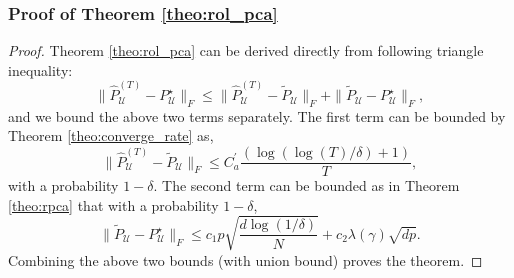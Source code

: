 \documentclass[11pt]{article}
\begin{document}
\subsubsection{Proof of Theorem \ref{theo:rol_pca}}
\begin{proof}
	Theorem \ref{theo:rol_pca} can be derived directly from following triangle inequality:
	\begin{equation*}
	\|\widehat{P}_\mathcal{U}^{(T)} - {P}_{\mathcal{U}}^{\star} \|_F \leq \|\widehat{P}_\mathcal{U}^{(T)} - \widetilde{P}_\mathcal{U} \|_F + \|\widetilde{P}_\mathcal{U} - {P}_{\mathcal{U}}^{\star}\|_F,
	\end{equation*} 
	and we  bound the above two terms separately. The first term can be bounded by Theorem \ref{theo:converge_rate} as,
	\begin{equation*}
	\|\widehat{P}_\mathcal{U}^{(T)} - \widetilde{P}_\mathcal{U} \|_F \leq C_a^\prime \frac{( \log(\log(T)/\delta)+1)}{ T},
	\end{equation*}
	with a probability $ 1-\delta $. The second term can be bounded as in Theorem \ref{theo:rpca} that with a probability $1-\delta$,
	\begin{equation*}
	 \|\widetilde{P}_\mathcal{U} - {P}_{\mathcal{U}}^{\star}\|_F \leq c_1p\sqrt{\frac{d\log(1/\delta) }{N}} + c_2 \lambda(\gamma)\sqrt{dp}.
	\end{equation*}	
	Combining the above two bounds (with union bound) proves the theorem.
\end{proof}
\end{document}

